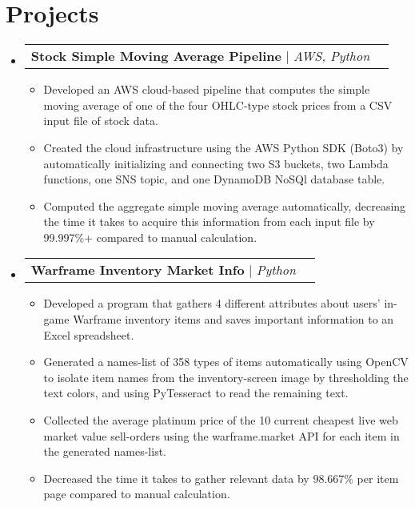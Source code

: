 \documentclass[letterpaper,11pt]{article}
\makeatletter
\newcommand{\resumeItem}[1]{
  \item\small{
    {#1 \vspace{-2pt}}
  }
}
\newcommand{\resumeProjectHeading}[2]{
    \item
    \begin{tabular*}{0.97\textwidth}{l@{\extracolsep{\fill}}r}
      \small#1 & #2 \\
    \end{tabular*}\vspace{-7pt}
}
\newcommand{\resumeSubHeadingListStart}{\begin{itemize}[leftmargin=0.15in, label={}]}
\newcommand{\resumeSubHeadingListEnd}{\end{itemize}}
\newcommand{\resumeItemListStart}{\begin{itemize}}
\newcommand{\resumeItemListEnd}{\end{itemize}\vspace{-5pt}}
\makeatother
\begin{document}
\section{Projects}
    \resumeSubHeadingListStart
      \resumeProjectHeading
          {\textbf{Stock Simple Moving Average Pipeline} $|$ \emph{AWS, Python}}{}
          \resumeItemListStart
            \resumeItem{Developed an AWS cloud-based pipeline that computes the simple moving average of one of the four OHLC-type stock prices from a CSV input file of stock data.}
            \resumeItem{Created the cloud infrastructure using the AWS Python SDK (Boto3) by automatically initializing and connecting two S3 buckets, two Lambda functions, one SNS topic, and one DynamoDB NoSQl database table.}
            \resumeItem{Computed the aggregate simple moving average automatically, decreasing the time it takes to acquire this information from each input file by 99.997\%+ compared to manual calculation.}
          \resumeItemListEnd
      \resumeProjectHeading
          {\textbf{Warframe Inventory Market Info} $|$ \emph{Python}}{}
          \resumeItemListStart
            \resumeItem{Developed a program that gathers 4 different attributes about users’ in-game Warframe inventory items and saves important information to an Excel spreadsheet.}
            \resumeItem{Generated a names-list of 358 types of items automatically using OpenCV to isolate item names from the inventory-screen image by thresholding the text colors, and using PyTesseract to read the remaining text.}
            \resumeItem{Collected the average platinum price of the 10 current cheapest live web market value sell-orders using the warframe.market API for each item in the generated names-list.}
            \resumeItem{Decreased the time it takes to gather relevant data by 98.667\% per item page compared to manual calculation.}
          \resumeItemListEnd
    \resumeSubHeadingListEnd


\end{document}

